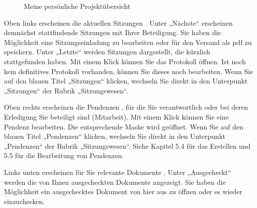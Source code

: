 \begin{figure}[H] %
\caption{Meine persönliche Projektübersicht}
\end{figure}

Oben links erscheinen die aktuellen Sitzungen . Unter „Nächste“ erscheinen demnächst stattfindende Sitzungen mit Ihrer Beteiligung. Sie haben die Möglichkeit eine Sitzungseinladung zu bearbeiten oder für den Versand als pdf zu speichern. Unter „Letzte“ werden Sitzungen dargestellt, die kürzlich stattgefunden haben. Mit einem Klick können Sie das Protokoll öffnen. Ist noch kein definitives Protokoll vorhanden, können Sie dieses noch bearbeiten. Wenn Sie auf den blauen Titel „Sitzungen“  klicken, wechseln Sie direkt in den Unterpunkt „Sitzungen“ der Rubrik „Sitzungswesen“.

\vspace{\baselineskip}

Oben rechts erscheinen die Pendenzen , für die Sie verantwortlich oder bei deren Erledigung Sie beteiligt sind (Mitarbeit). Mit einem Klick können Sie eine Pendenz bearbeiten. Die entsprechende Maske wird geöffnet. Wenn Sie auf den blauen Titel „Pendenzen“  klicken, wechseln Sie direkt in den Unterpunkt „Pendenzen“ der Rubrik „Sitzungswesen“. Siehe Kapitel 5.4 für das Erstellen und 5.5 für die Bearbeitung von Pendenzen.

\vspace{\baselineskip}

Links unten erscheinen für Sie relevante Dokumente . Unter „Ausgecheckt“ werden die von Ihnen ausgecheckten Dokumente angezeigt. Sie haben die Möglichkeit ein ausgechecktes Dokument von hier aus zu öffnen oder es wieder einzuchecken. \\

